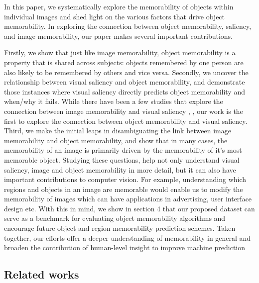 In this paper, we systematically explore the memorability of objects within individual images and shed light on the various factors that drive object memorability. In exploring the connection between object memorability, saliency, and image memorability, our paper makes several important contributions.

Firstly, we show that just like image memorability, object memorability is a property that is shared across subjects: objects remembered by one person are also likely to be remembered by others and vice versa. Secondly, we uncover the relationship between visual saliency and object memorability, and demonstrate those instances where visual saliency directly predicts object memorability and when/why it fails. While there have been a few studies that explore the connection between image memorability and visual saliency \cite{zoya15}, \cite{lemeur13}, our work is the first to explore the connection between object memorability and visual saliency. Third, we make the initial leaps in disambiguating the link between image memorability and object memorability, and show that in many cases, the memorability of an image is primarily driven by the memorability of it’s most memorable object. Studying these questions, help not only understand visual saliency, image and object memorability in more detail, but it can also have important contributions to computer vision. For example, understanding which regions and objects in an image are memorable would enable us to modify the memorability of images which can have applications in advertising, user interface design etc. With this in mind, we show in section 4 that our proposed dataset can serve as a benchmark for evaluating object memorability algorithms and encourage future object and region memorability prediction schemes. Taken together, our efforts offer a deeper understanding of memorability in general and broaden the contribution of human-level insight to improve machine prediction

\subsection{Related works}
 